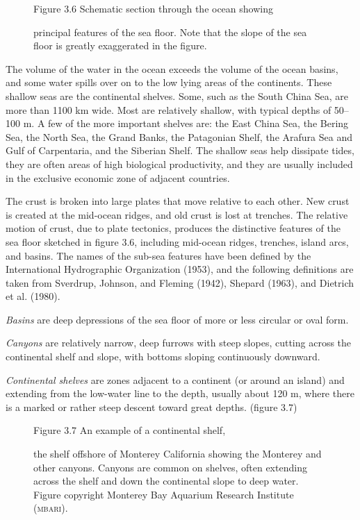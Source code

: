 \begin{figure}[b!]
\centering
\vspace{-2ex}
\footnotesize
Figure 3.6 Schematic section through the ocean showing\rule{0pt}{4ex} principal
features of the sea floor. Note that the slope of the sea floor is greatly
exaggerated in the figure.
\label{fig:bathysketch}
\end{figure}

The volume of the water in the ocean exceeds the volume of the ocean basins, and
some water spills over on to the low lying areas of the continents. These shallow
seas are the continental shelves. Some, such as the South China Sea,
are more than 1100 km wide. Most are relatively shallow, with typical depths of
50--100 m. A few of the more important shelves are: the East China Sea, the Bering
Sea, the North Sea, the Grand Banks, the Patagonian Shelf, the Arafura Sea and
Gulf of Carpentaria, and the Siberian Shelf. The shallow seas help dissipate
tides, they are often areas of high biological productivity, and they are usually included in
the exclusive economic zone of adjacent countries.

The crust is broken into large plates that move relative to each other. New
crust is created at the mid-ocean ridges, and old crust is lost at trenches. The
relative motion of crust, due to plate tectonics, produces the distinctive
features of the sea floor sketched in figure 3.6, including mid-ocean ridges,
trenches, island arcs, and basins.
The names of the sub-sea features have been defined by the
International Hydrographic Organization (1953), and
the following definitions are taken from Sverdrup, Johnson, and Fleming (1942), Shepard
(1963), and Dietrich et al. (1980).

\textit{Basins} are deep depressions of the sea floor of more or
less circular or oval form.

\textit{Canyons} are relatively narrow, deep furrows with
steep slopes, cutting across the continental shelf and slope, with bottoms sloping
continuously downward.

\textit{Continental shelves} are zones adjacent
to a continent (or around an island) and extending from the low-water line to the depth,
usually about 120 m, where there is a marked or rather steep descent toward great
depths. (figure 3.7)
\begin{figure}[b!]
\vspace{-2ex}
\footnotesize
Figure 3.7 An example of a continental shelf,\rule{0pt}{3ex} the
shelf offshore of Monterey California showing the Monterey and other
canyons.  Canyons are common on shelves, often extending across the shelf and
down the continental slope to deep water. Figure copyright Monterey
Bay Aquarium Research Institute (\textsc{mbari}).
\label{fig:canyon}
\end{figure}

